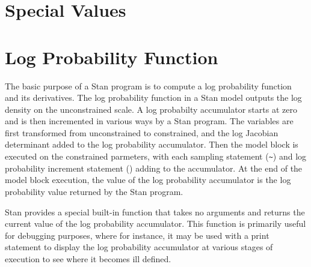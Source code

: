 \section{Special Values}

\begin{description}
%
%
%
%
\end{description}


\section{Log Probability Function}\label{get-lp.section}

The basic purpose of a Stan program is to compute a log probability
function and its derivatives.  The log probability function in a Stan
model outputs the log density on the unconstrained scale.  A log
probabilty accumulator starts at zero and is then incremented in
various ways by a Stan program.  The variables are first transformed
from unconstrained to constrained, and the log Jacobian determinant
added to the log probability accumulator.  Then the model block is
executed on the constrained parmeters, with each sampling statement
(\Verb|~|) and log probability increment statement
() adding to the accumulator.  At the end
of the model block execution, the value of the log probability
accumulator is the log probability value returned by the Stan program.

Stan provides a special built-in function  that takes no
arguments and returns the current value of the log probability
accumulator.  This function is primarily useful for debugging
purposes, where for instance, it may be used with a print statement to
display the log probability accumulator at various stages of execution
to see where it becomes ill defined.

\begin{description}
\end{description}

